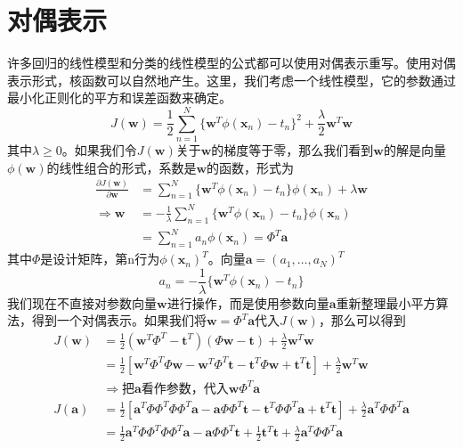 \section{对偶表示}
许多回归的线性模型和分类的线性模型的公式都可以使用对偶表示重写。使用对偶表示形式，核函数可以自然地产生。这里，我们考虑一个线性模型，它的参数通过最小化正则化的平方和误差函数来确定。
\begin{equation}
	J(\boldsymbol{w})=\frac{1}{2}\sum_{n=1}^{N}\{\boldsymbol{w}^T\phi(\boldsymbol{x}_n)-t_n \}^2+\frac{\lambda}{2}\boldsymbol{w}^T\boldsymbol{w}
\end{equation}
其中$\lambda \geqslant 0$。如果我们令$J(\boldsymbol{w})$关于$\boldsymbol{w}$的梯度等于零，那么我们看到$\boldsymbol{w}$的解是向量$\phi(\boldsymbol{w})$的线性组合的形式，系数是$\boldsymbol{w}$的函数，形式为
\begin{equation}
\begin{aligned}
	\frac{\partial J(\boldsymbol{w})}{\partial \boldsymbol{w}}&=\sum_{n=1}^{N}\{\boldsymbol{w}^T\phi(\boldsymbol{x}_n) -t_n \}\phi(\boldsymbol{x}_n)+\lambda \boldsymbol{w} \\
	\Rightarrow	\boldsymbol{w}&=-\frac{1}{\lambda}\sum_{n=1}^{N}\{\boldsymbol{w}^T\phi(\boldsymbol{x}_n)-t_n \}\phi(\boldsymbol{x}_n)\\
	&=\sum_{n=1}^{N}a_n\phi(\boldsymbol{x}_n)=\Phi^T\boldsymbol{a}
\end{aligned}
\end{equation}
其中$\Phi$是设计矩阵，第n行为$\phi(\boldsymbol{x}_n)^T$。向量$\boldsymbol{a}=(a_1,\dots,a_N)^T$
\begin{equation}
\label{no}
	a_n=-\frac{1}{\lambda}\{\boldsymbol{w}^T\phi(\boldsymbol{x}_n)-t_n \}
\end{equation}
我们现在不直接对参数向量$\boldsymbol{w}$进行操作，而是使用参数向量$\boldsymbol{a}$重新整理最小平方算法，得到一个对偶表示。如果我们将$\boldsymbol{w}=\Phi^T\boldsymbol{a}$代入$J(\boldsymbol{w})$，那么可以得到 
\begin{equation}
	\begin{aligned}
		J(\boldsymbol{w})&=\frac{1}{2}(\boldsymbol{w}^T\Phi^T-\boldsymbol{t}^T)(\Phi\boldsymbol{w}-\boldsymbol{t})+\frac{\lambda}{2}\boldsymbol{w}^T\boldsymbol{w}\\
		&=\frac{1}{2}\left[\boldsymbol{w}^T\Phi^T\Phi\boldsymbol{w}-\boldsymbol{w}^T\Phi^T\boldsymbol{t}-\boldsymbol{t}^T\Phi\boldsymbol{w}+\boldsymbol{t}^T\boldsymbol{t} \right]+\frac{\lambda}{2}\boldsymbol{w}^T\boldsymbol{w}\\
		&\Rightarrow \text{把$\boldsymbol{a}$看作参数，代入$\boldsymbol{w}\Phi^T\boldsymbol{a}$}\\
		J(\boldsymbol{a})&=\frac{1}{2}\left[\boldsymbol{a}^T\Phi\Phi^T\Phi\Phi^T\boldsymbol{a}-\boldsymbol{a}\Phi\Phi^T\boldsymbol{t}-\boldsymbol{t}^T\Phi\Phi^T\boldsymbol{a}+\boldsymbol{t}^T\boldsymbol{t} \right]+\frac{\lambda}{2}\boldsymbol{a}^T\Phi\Phi^T\boldsymbol{a}\\
		&=\frac{1}{2}\boldsymbol{a}^T\Phi\Phi^T\Phi\Phi^T\boldsymbol{a}-\boldsymbol{a}\Phi\Phi^T\boldsymbol{t}+\frac{1}{2}\boldsymbol{t}^T\boldsymbol{t}+\frac{\lambda}{2}\boldsymbol{a}^T\Phi\Phi^T\boldsymbol{a}
	\end{aligned}
\end{equation}
